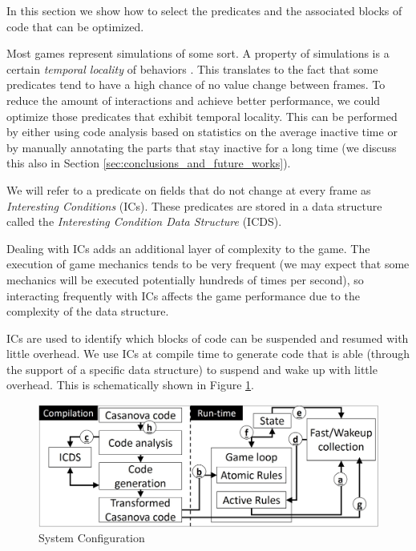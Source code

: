 In this section we show how to select the predicates and the associated blocks of code that can be optimized.

Most games represent simulations of some sort. A property of simulations is a certain \textit{temporal locality} of behaviors \cite{ai_dithering}. This translates to the fact that some predicates tend to have a high chance of no value change between frames. To reduce the amount of interactions and achieve better performance, we could optimize those predicates that exhibit temporal locality. This can be performed by either using code analysis based on statistics on the average inactive time or by manually annotating the parts that stay inactive for a long time (we discuss this also in Section \ref{sec:conclusions_and_future_works}).

We will refer to a predicate on fields that do not change at every frame as \textit{Interesting Conditions} (ICs). These predicates are stored in a data structure called the \textit{Interesting Condition Data Structure} (ICDS).

Dealing with ICs adds an additional layer of complexity to the game. The execution of game mechanics tends to be very frequent (we may expect that some mechanics will be executed potentially hundreds of times per second), so interacting frequently with ICs affects the game performance due to the complexity of the data structure.

ICs are used to identify which blocks of code can be suspended and resumed with little overhead. We use ICs at compile time to generate code that is able (through the support of a specific data structure) to suspend and wake up with little overhead. This is schematically shown in Figure \ref{fig:system_configuration}.

\begin{figure}[!ht]
		\centering
         \includegraphics[width=1\textwidth]{Figures/system_description.jpg}
         \caption{System Configuration}
         \label{fig:system_configuration}
\end{figure}

